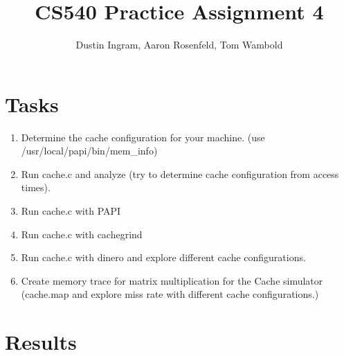 \documentclass{article}
\title{CS540 Practice Assignment 4}
\author{Dustin Ingram, Aaron Rosenfeld, Tom Wambold}
\begin{document}
\maketitle
\newpage
\section{Tasks}
\begin{enumerate}
    \item Determine the cache configuration for your machine. (use /usr/local/papi/bin/mem\_info)
    \item Run cache.c and analyze (try to determine cache configuration from access times).
    \item Run cache.c with PAPI
    \item Run cache.c with cachegrind
    \item Run cache.c with dinero and explore different cache configurations.
    \item Create memory trace for matrix multiplication for the Cache simulator (cache.map and explore miss rate with different cache configurations.)
\end{enumerate}
\newpage
\section{Results}
\end{document}
